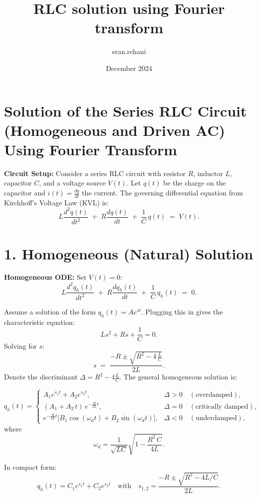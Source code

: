 \documentclass{article}
\title{RLC solution using Fourier transform}
\author{eran.rehani }
\date{December 2024}
\begin{document}
\maketitle

\section*{Solution of the Series RLC Circuit (Homogeneous and Driven AC) Using Fourier Transform}

\noindent \textbf{Circuit Setup:} 
Consider a series RLC circuit with resistor $R$, inductor $L$, capacitor $C$, and a voltage source $V(t)$. Let $q(t)$ be the charge on the capacitor and $i(t) = \frac{dq}{dt}$ the current. The governing differential equation from Kirchhoff's Voltage Law (KVL) is:
\[
L \frac{d^2 q(t)}{dt^2} \;+\; R \frac{d q(t)}{dt} \;+\; \frac{1}{C} \, q(t) \;=\; V(t).
\]

\vspace{1em}
\section*{1. Homogeneous (Natural) Solution}

\noindent \textbf{Homogeneous ODE:} Set $V(t) = 0$:
\[
L \frac{d^2 q_h(t)}{dt^2} \;+\; R \frac{d q_h(t)}{dt} \;+\; \frac{1}{C} \, q_h(t) \;=\; 0.
\]

\noindent Assume a solution of the form $q_h(t) = A e^{s t}$. Plugging this in gives the characteristic equation:
\[
L s^2 + R s + \frac{1}{C} = 0.
\]
Solving for $s$:
\[
s \;=\; \frac{-R \pm \sqrt{R^2 - 4\,\frac{L}{C}}}{2L}.
\]
Denote the discriminant $\Delta = R^2 - 4\frac{L}{C}$. The general homogeneous solution is:

\[
q_h(t) = 
\begin{cases}
A_1 e^{s_1 t} + A_2 e^{s_2 t}, & \Delta > 0 \quad (\text{overdamped}), \\[1em]
(A_1 + A_2\,t)\,e^{-\frac{R}{2L}t}, & \Delta = 0 \quad (\text{critically damped}), \\[1em]
e^{-\frac{R}{2L}t}\Big[B_1 \cos(\omega_d t) + B_2 \sin(\omega_d t)\Big], & \Delta < 0 \quad (\text{underdamped}),
\end{cases}
\]
where 
\[
\omega_d = \frac{1}{\sqrt{LC}}\sqrt{1 - \frac{R^2\,C}{4L}}.
\]

\noindent In compact form:
\[
q_h(t) = C_1 e^{s_1 t} + C_2 e^{s_2 t} \quad \text{with} \quad s_{1,2} = \frac{-R \pm \sqrt{R^2 - 4L/C}}{2L}.
\]

\vspace{1em}
\end{document}

